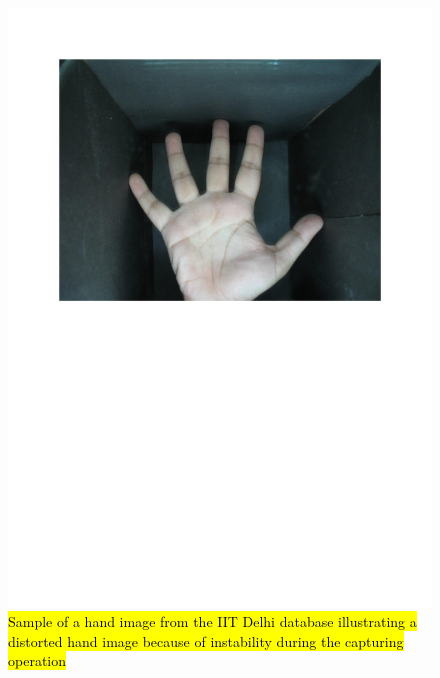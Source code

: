 \documentclass[review]{elsarticle}
\begin{document}
		\begin{figure}[!h]
			\centering
			\includegraphics[page=7,scale=.57,trim=1cm 14.7cm 1cm 1.7cm,clip]{IIT_problematic.pdf}
			\caption{\hl{Sample of a hand image from the IIT Delhi database illustrating a distorted hand image because of instability during the capturing operation}}
			\label{fig:IIT_problematic_hand6}
		\end{figure}
\end{document}
